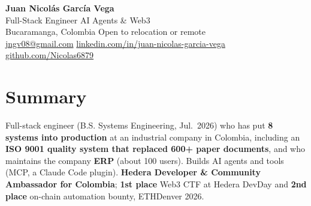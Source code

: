 \documentclass[a4paper,10pt]{article}
\begin{document}
\begin{center}
    {\huge \textbf{Juan Nicolás García Vega}} \\[0.3em]
    Full-Stack Engineer \textbar{} AI Agents \& Web3 \\[0.35em]
    Bucaramanga, Colombia \textperiodcentered{} Open to relocation or remote \\
    \href{mailto:jngv08@gmail.com}{jngv08@gmail.com} \textperiodcentered{}
    \href{https://www.linkedin.com/in/juan-nicolas-garcia-vega}{linkedin.com/in/juan-nicolas-garcia-vega} \textperiodcentered{}
    \href{https://github.com/Nicolas6879}{github.com/Nicolas6879}
\end{center}

\section*{Summary}
Full-stack engineer (B.S. Systems Engineering, Jul.\ 2026) who has put \textbf{8 systems
into production} at an industrial company in Colombia, including an \textbf{ISO 9001 quality system that replaced
600+ paper documents}, and who maintains the company \textbf{ERP} (about 100 users). Builds
AI agents and tools (MCP, a Claude Code plugin). \textbf{Hedera Developer \& Community
Ambassador for Colombia}; \textbf{1st place} Web3 CTF at Hedera DevDay and \textbf{2nd place}
on-chain automation bounty, ETHDenver 2026.

\end{document}

